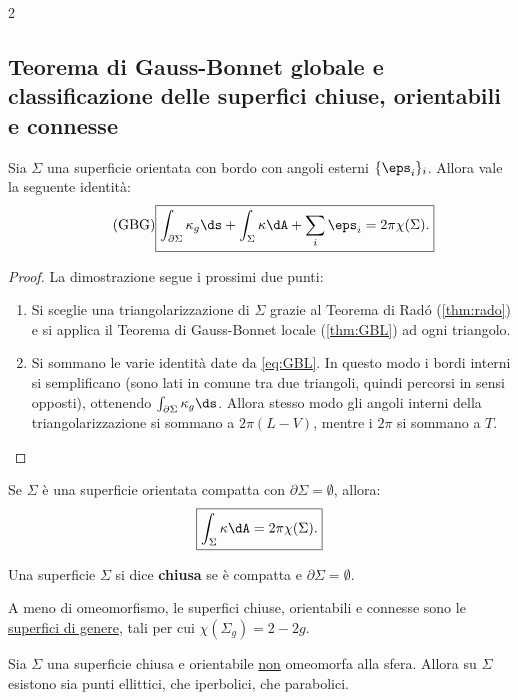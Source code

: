 \begin{multicols*}{2}
    \subsection{Teorema di Gauss-Bonnet globale e classificazione delle superfici chiuse, orientabili e connesse}

    \begin{theorem} \label{thm:GBG}
        Sia $\Sigma$ una superficie orientata con bordo con angoli esterni $\{\eps_i\}_i$. Allora vale
        la seguente identità:
        \begin{equation} \label{eq:GBG} \tag{GBG}
            \boxed{\int_{\partial \Sigma} \kappa_g \ds + \int_\Sigma \kappa \dA + \sum_i \eps_i = 2\pi \chi(\Sigma).}
        \end{equation}
    \end{theorem}

    \begin{proof}
        La dimostrazione segue i prossimi due punti:
        \begin{enumerate}
            \item Si sceglie una triangolarizzazione di $\Sigma$ grazie al Teorema di Radó (\ref{thm:rado}) e si applica il Teorema di Gauss-Bonnet locale
                  (\ref{thm:GBL}) ad ogni triangolo.
            \item Si sommano le varie identità date da \eqref{eq:GBL}. In questo modo i bordi interni si semplificano
                  (sono lati in comune tra due triangoli, quindi percorsi in sensi opposti), ottenendo
                  $\int_{\partial \Sigma} \kappa_g \ds$. Allora stesso modo gli angoli interni della triangolarizzazione si sommano
                  a $2\pi (L - V)$, mentre i $2\pi$ si sommano a $T$.
        \end{enumerate}
    \end{proof}

    \begin{corollary}
        Se $\Sigma$ è una superficie orientata compatta con $\partial \Sigma = \emptyset$, allora:
        \[
            \boxed{\int_\Sigma \kappa \dA = 2\pi \chi(\Sigma).}
        \]
    \end{corollary}

    \begin{definition}
        Una superficie $\Sigma$ si dice \textbf{chiusa} se è
        compatta e $\partial \Sigma = \emptyset$.
    \end{definition}

    \begin{theorem}
        A meno di omeomorfismo, le superfici chiuse, orientabili e connesse
        sono le \underline{superfici di genere}, tali per cui $\chi(\Sigma_g) = 2-2g$.
    \end{theorem}

    \begin{corollary}
        Sia $\Sigma$ una superficie chiusa e orientabile \underline{non}
        omeomorfa alla sfera. Allora su $\Sigma$ esistono sia punti ellittici,
        che iperbolici, che parabolici.
    \end{corollary}
\end{multicols*}
